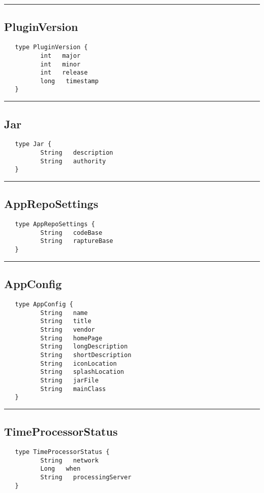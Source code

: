 \rule{15cm}{2pt}
\subsection{PluginVersion}
\label{type:PluginVersion}

\begin{verbatim}
   type PluginVersion {
          int   major
          int   minor
          int   release
          long   timestamp
   }
\end{verbatim}

\rule{15cm}{2pt}
\subsection{Jar}
\label{type:Jar}

\begin{verbatim}
   type Jar {
          String   description
          String   authority
   }
\end{verbatim}

\rule{15cm}{2pt}
\subsection{AppRepoSettings}
\label{type:AppRepoSettings}

\begin{verbatim}
   type AppRepoSettings {
          String   codeBase
          String   raptureBase
   }
\end{verbatim}

\rule{15cm}{2pt}
\subsection{AppConfig}
\label{type:AppConfig}

\begin{verbatim}
   type AppConfig {
          String   name
          String   title
          String   vendor
          String   homePage
          String   longDescription
          String   shortDescription
          String   iconLocation
          String   splashLocation
          String   jarFile
          String   mainClass
   }
\end{verbatim}

\rule{15cm}{2pt}
\subsection{TimeProcessorStatus}
\label{type:TimeProcessorStatus}

\begin{verbatim}
   type TimeProcessorStatus {
          String   network
          Long   when
          String   processingServer
   }
\end{verbatim}

